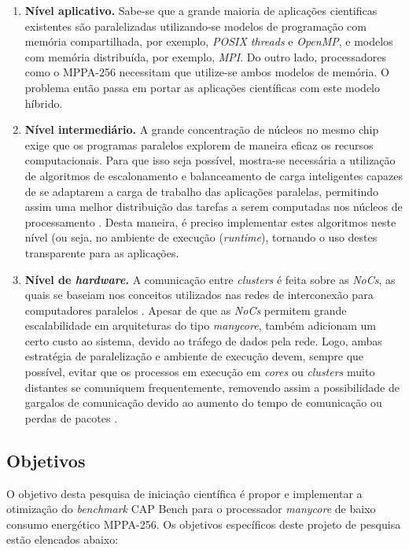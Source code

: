 \documentclass[a4paper,11pt]{article}
\newcommand{\mppa}{MPPA-256\xspace}
\newcommand{\capb}{CAP Bench\xspace}
\newcommand{\manycore}{\textit{manycore}\xspace}
\newcommand{\bench}{\textit{benchmark}\xspace}
\begin{document}
\begin{enumerate}

	\item \textbf{Nível aplicativo.} Sabe-se que a grande maioria de aplicações cientificas existentes são paralelizadas utilizando-se modelos de programação com memória compartilhada, por exemplo, \textit{POSIX threads} e \textit{OpenMP}, e modelos com memória distribuída, por exemplo, \textit{MPI}. Do outro lado, processadores como o \mppa necessitam que utilize-se ambos modelos de memória. O problema então passa em portar as aplicações científicas com este modelo híbrido.
		
	\item \textbf{Nível intermediário.} A grande concentração de núcleos no mesmo chip exige que os programas paralelos explorem de maneira eficaz os recursos computacionais. Para que isso seja possível, mostra-se necessária a utilização de algoritmos de escalonamento e balanceamento de carga inteligentes capazes de se adaptarem a carga de trabalho das aplicações paralelas, permitindo assim uma melhor distribuição das tarefas a serem computadas
nos núcleos de processamento \cite{penna:hal-01239916}. Desta maneira, é preciso implementar estes algoritmos neste nível (ou seja, no ambiente de execução (\textit{runtime}), tornando o uso destes transparente para as aplicações.

	\item \textbf{Nível de \emph{hardware}.} A comunicação entre \textit{clusters} é feita sobre as \textit{NoCs}, as quais se baseiam nos conceitos utilizados nas redes de interconexão para computadores paralelos \cite{4586199}. Apesar de que as \textit{NoCs} permitem grande escalabilidade em arquiteturas do tipo \manycore, também adicionam um certo custo ao sistema, devido ao tráfego de dados pela rede. Logo, ambas estratégia de paralelização e ambiente de execução devem, sempre que possível, evitar que os processos em execução em \textit{cores} ou \textit{clusters} muito distantes se comuniquem frequentemente, removendo assim a possibilidade de gargalos de comunicação devido ao aumento do tempo de comunicação ou perdas de pacotes \cite{5452474, 6112995}.
	
\end{enumerate}

\subsection{Objetivos}

O objetivo desta pesquisa de iniciação científica é propor e implementar a otimização do \bench \capb para o processador \manycore de baixo consumo energético \mppa. Os objetivos específicos deste projeto de pesquisa estão elencados abaixo:
\end{document}
